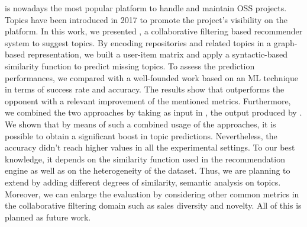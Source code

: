 \GH is nowadays the most popular platform to handle and maintain OSS projects. 
Topics have been introduced in 2017 to promote the project's visibility on the 
platform. 
In this work, we presented \CT, a collaborative filtering based recommender 
system to suggest \GH topics.  By encoding repositories and related topics in a 
graph-based representation, we built a user-item matrix and apply a 
syntactic-based similarity function to predict missing topics. To assess the 
prediction performances, we compared \CT with a well-founded work based on an 
ML technique in terms of success rate and accuracy. The results show that \CT 
outperforms the opponent with a relevant improvement of the mentioned metrics. 
Furthermore, we combined the two approaches by taking as input in \TF, the 
output produced by \MNB. We shown that by means of such a combined usage of the 
approaches, it is possible to obtain a significant boost in topic predictions. 
Nevertheless, the accuracy didn't reach higher values in all the experimental 
settings. To our best knowledge, it depends on the similarity function used in 
the recommendation engine as well as on the heterogeneity of the dataset. Thus, 
we are planning to extend \CT by adding different degrees of similarity, \eg 
semantic analysis on topics. Moreover, we can enlarge the evaluation by 
considering other common metrics in the collaborative filtering domain such as 
sales diversity and novelty. All of this is planned as future work.
